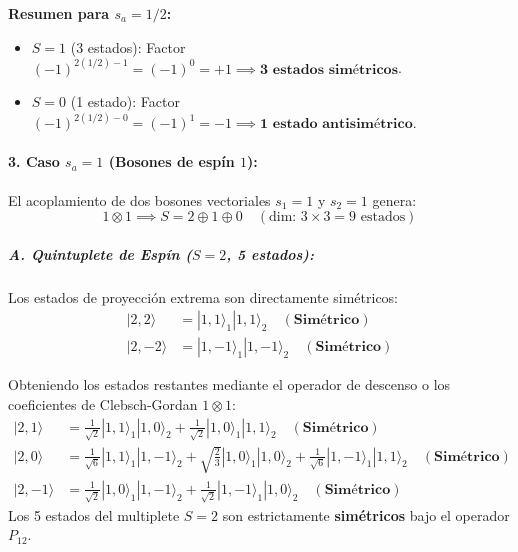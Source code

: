 \begin{problema}
\textbf{Resumen para $s_a = 1/2$:}
\begin{itemize}
    \item $S = 1$ (3 estados): Factor $(-1)^{2(1/2) - 1} = (-1)^0 = +1 \implies \mathbf{3 \text{ estados simétricos}}$.
    \item $S = 0$ (1 estado): Factor $(-1)^{2(1/2) - 0} = (-1)^1 = -1 \implies \mathbf{1 \text{ estado antisimétrico}}$.
\end{itemize}

\paragraph{3. Caso $s_a = 1$ (Bosones de espín $1$):}
El acoplamiento de dos bosones vectoriales $s_1 = 1$ y $s_2 = 1$ genera:
\begin{equation*}
1 \otimes 1 \implies S = 2 \oplus 1 \oplus 0 \quad (\text{dim: } 3 \times 3 = 9 \text{ estados})
\end{equation*}

\subparagraph{A. Quintuplete de Espín ($S = 2$, 5 estados):}
Los estados de proyección extrema son directamente simétricos:
\begin{align}
|2, 2\rangle &= |1, 1\rangle_1 |1, 1\rangle_2 \quad (\mathbf{\text{Simétrico}}) \\
|2, -2\rangle &= |1, -1\rangle_1 |1, -1\rangle_2 \quad (\mathbf{\text{Simétrico}})
\end{align}

Obteniendo los estados restantes mediante el operador de descenso o los coeficientes de Clebsch-Gordan $1 \otimes 1$:
\begin{align}
|2, 1\rangle &= \frac{1}{\sqrt{2}} |1, 1\rangle_1 |1, 0\rangle_2 + \frac{1}{\sqrt{2}} |1, 0\rangle_1 |1, 1\rangle_2 \quad (\mathbf{\text{Simétrico}}) \\
|2, 0\rangle &= \frac{1}{\sqrt{6}} |1, 1\rangle_1 |1, -1\rangle_2 + \sqrt{\frac{2}{3}} |1, 0\rangle_1 |1, 0\rangle_2 + \frac{1}{\sqrt{6}} |1, -1\rangle_1 |1, 1\rangle_2 \quad (\mathbf{\text{Simétrico}}) \\
|2, -1\rangle &= \frac{1}{\sqrt{2}} |1, 0\rangle_1 |1, -1\rangle_2 + \frac{1}{\sqrt{2}} |1, -1\rangle_1 |1, 0\rangle_2 \quad (\mathbf{\text{Simétrico}})
\end{align}
Los 5 estados del multiplete $S = 2$ son estrictamente \textbf{simétricos} bajo el operador $P_{12}$.


\end{problema}
